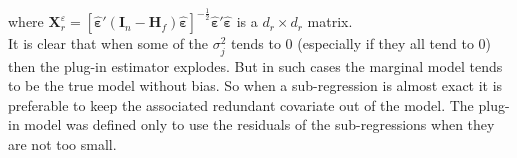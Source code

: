 \documentclass[12pt,a4paper]{report}
\begin{document}
where $\boldsymbol{X}_r^{\varepsilon}=[\hat{\boldsymbol{\varepsilon}}'(\boldsymbol{I}_n-\boldsymbol{H}_f)\hat{\boldsymbol{\varepsilon}}]^{-\frac{1}{2}}\hat{\boldsymbol{\varepsilon}}'\hat{\boldsymbol{\varepsilon}}$ is a $d_r\times d_r$ matrix.\\ It is clear that when some of the $\sigma_j^2$ tends to 0 (especially if they all tend to 0) then the plug-in estimator explodes. But in such cases the marginal model tends to be the true model without bias. So when a sub-regression is almost exact it is preferable to keep the associated redundant covariate out of the model. The plug-in model was defined only to use the residuals of the sub-regressions when they are not too small.
\end{document}
